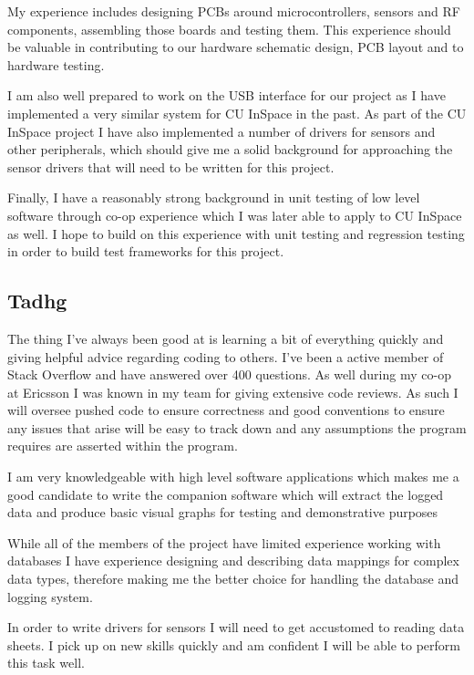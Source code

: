 My experience includes designing PCBs around microcontrollers, sensors and RF
components, assembling those boards and testing them.  This experience should be
valuable in contributing to our hardware schematic design, PCB layout and to
hardware testing.

I am also well prepared to work on the USB interface for our project as I have
implemented a very similar system for CU InSpace in the past.  As part of the
CU InSpace project I have also implemented a number of drivers for sensors and
other peripherals, which should give me a solid background for approaching the
sensor drivers that will need to be written for this project.

Finally, I have a reasonably strong background in unit testing of low level
software through co-op experience which I was later able to apply to CU InSpace
as well.  I hope to build on this experience with unit testing and regression
testing in order to build test frameworks for this project.

\subsection{Tadhg}


The thing I've always been good at is learning a bit of everything quickly and
giving helpful advice regarding coding to others.  I've been a active member of Stack Overflow
and have answered over 400 questions.  As well during my co-op at Ericsson I was
known in my team for giving extensive code reviews.  As such I will oversee pushed
code to ensure correctness and good conventions to ensure any issues that arise will
be easy to track down and any assumptions the program requires are asserted
within the program.

I am very knowledgeable with high level software applications which makes me a good
candidate to write the companion software which will extract the logged data and
produce basic visual graphs for testing and demonstrative purposes

While all of the members of the project have limited experience working with databases
I have experience designing and describing data mappings for complex data types,
therefore making me the better choice for handling the database and logging system.

In order to write drivers for sensors I will need to get accustomed to reading
data sheets.  I pick up on new skills quickly and am confident I will be able
to perform this task well.


